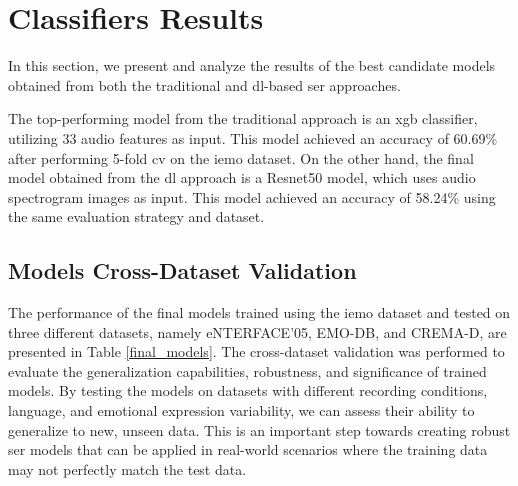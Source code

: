 \section{Classifiers Results}

In this section, we present and analyze the results of the best candidate models obtained from both the traditional and \ac{dl}-based \ac{ser} approaches.

The top-performing model from the traditional approach is an \ac{xgb} classifier, utilizing 33 audio features as input. This model achieved an accuracy of 60.69\% after performing 5-fold \ac{cv} on the \ac{iemo} dataset. On the other hand, the final model obtained from the \ac{dl} approach is a Resnet50 model, which uses audio spectrogram images as input. This model achieved an accuracy of 58.24\% using the same evaluation strategy and dataset.


\subsection{Models Cross-Dataset Validation}

The performance of the final models trained using the \ac{iemo} dataset and tested on three different datasets, namely eNTERFACE'05, EMO-DB, and CREMA-D, are presented in Table \ref{final_models}. The cross-dataset validation was performed to evaluate the generalization capabilities, robustness, and significance of trained models. By testing the models on datasets with different recording conditions, language, and emotional expression variability, we can assess their ability to generalize to new, unseen data. This is an important step towards creating robust \ac{ser} models that can be applied in real-world scenarios where the training data may not perfectly match the test data.


